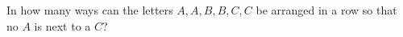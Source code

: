 In how many ways can the letters $A,A,B,B,C,C$ be arranged in a row so that no $A$ is next to a $C$?
